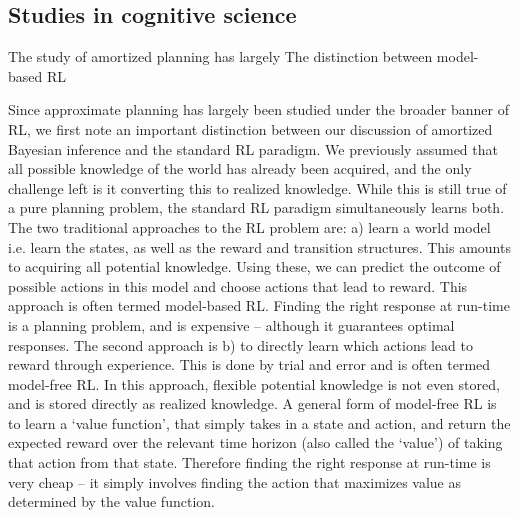 \subsection*{Studies in cognitive science}

The study of amortized planning has largely 
The distinction between model-based RL



Since approximate planning has largely been studied under the broader banner of RL, we first note an important distinction between our discussion of amortized Bayesian inference and the standard RL paradigm. We previously assumed that all possible knowledge of the world has already been acquired, and the only challenge left is it converting this to realized knowledge. While this is still true of a pure planning problem, the standard RL paradigm simultaneously learns both. The two traditional approaches to the RL problem are: a) learn a world model i.e. learn the states, as well as the reward and transition structures. This amounts to acquiring all potential knowledge. Using these, we can predict the outcome of possible actions in this model and choose actions that lead to reward. This approach is often termed model-based RL. Finding the right response at run-time is a planning problem, and is expensive -- although it guarantees optimal responses. The second approach is b) to directly learn which actions lead to reward through experience. This is done by trial and error and is often termed model-free RL. In this approach, flexible potential knowledge is not even stored, and is stored directly as realized knowledge. A general form of model-free RL is to learn a `value function', that simply takes in a state and action, and return the expected reward over the relevant time horizon (also called the `value') of taking that action from that state. Therefore finding the right response at run-time is very cheap -- it simply involves finding the action that maximizes value as determined by the value function.

